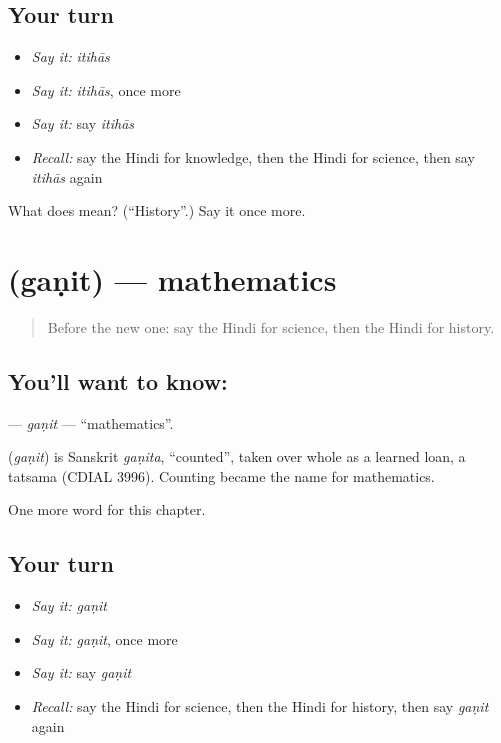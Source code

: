 \subsection*{Your turn}
\begin{itemize}
\raggedright
  \item \emph{Say it:} \emph{itihās}
  \item \emph{Say it:} \emph{itihās}, once more
  \item \emph{Say it:} say \emph{itihās}
  \item \emph{Recall:} say the Hindi for knowledge, then the Hindi for science, then say \emph{itihās} again
\end{itemize}

\begin{tcolorbox}[breakable,colback=teal!4,colframe=teal!35!black,title={Before you move on}]
What does  mean? (\textquotedblleft{}History\textquotedblright{}.) Say it once more.
\end{tcolorbox}
\section[\texorpdfstring{\hi{गणित} (gaṇit)}{गणित (gaṇit)}]{ (gaṇit) — mathematics}

\label{lesson:HI-C199-ganit}



\begin{quote}
Before the new one: say the Hindi for science, then the Hindi for history.
\end{quote}

\subsection*{You'll want to know: }
\textbf{} — \emph{gaṇit} — \textquotedblleft{}mathematics\textquotedblright{}.

\begin{cousinweb}
\textbf{} (\emph{gaṇit}) is Sanskrit \emph{gaṇita}, \textquotedblleft{}counted\textquotedblright{}, taken over whole as a learned loan, a tatsama (CDIAL 3996). Counting became the name for mathematics.
\end{cousinweb}

\begin{grammarlens}[title={What you've built}]
One more word for this chapter.
\end{grammarlens}

\subsection*{Your turn}
\begin{itemize}
\raggedright
  \item \emph{Say it:} \emph{gaṇit}
  \item \emph{Say it:} \emph{gaṇit}, once more
  \item \emph{Say it:} say \emph{gaṇit}
  \item \emph{Recall:} say the Hindi for science, then the Hindi for history, then say \emph{gaṇit} again
\end{itemize}

